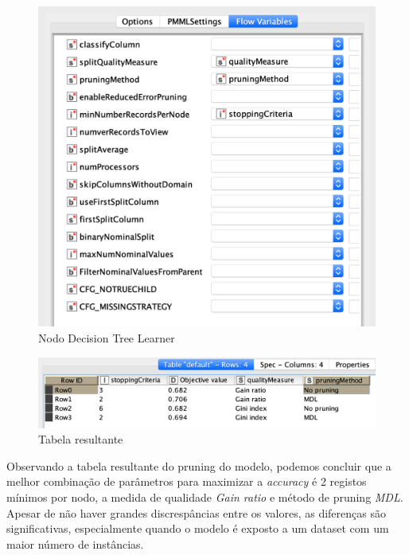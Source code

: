 \begin{figure}[H]
    \centering
    \includegraphics[scale=0.4]{Images/T4_c2.png}
    \caption{Nodo Decision Tree Learner}
\end{figure}

\begin{figure}[H]
    \centering
    \includegraphics[scale=0.4]{Images/T4_c3.png}
    \caption{Tabela resultante}
\end{figure}

Observando a tabela resultante do pruning do modelo, podemos concluir que a melhor combinação de parâmetros para maximizar a \textit{accuracy} é 2 registos mínimos por nodo, a medida de qualidade \textit{Gain ratio} e método de pruning \textit{MDL}.
Apesar de não haver grandes discrespâncias entre os valores, as diferenças são significativas, especialmente quando o modelo é exposto a um dataset com um maior número de instâncias.